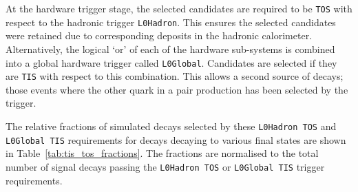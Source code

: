 At the hardware trigger stage, the selected candidates are required to be \texttt{TOS} with respect to the hadronic trigger \texttt{L0Hadron}. This ensures the selected candidates were retained due to corresponding deposits in the hadronic calorimeter. 
Alternatively, the logical `or' of each of the hardware sub-systems is combined into a global hardware trigger called \texttt{L0Global}.
Candidates are selected if they are \texttt{TIS} with respect to this combination.
This allows a second source of decays; those events where the other \bquark quark in a \bquark\bquarkbar pair production has been selected by the trigger. 



The relative fractions of simulated decays selected by these \texttt{L0Hadron TOS} and \texttt{L0Global TIS} requirements for \decay{\Bp}{\Dsp\phiz} decays decaying to various \Dsp final states are shown in Table~\ref{tab:tis_tos_fractions}. The fractions are normalised to the total number of signal decays passing the \texttt{L0Hadron TOS} or \texttt{L0Global TIS} trigger requirements. 

